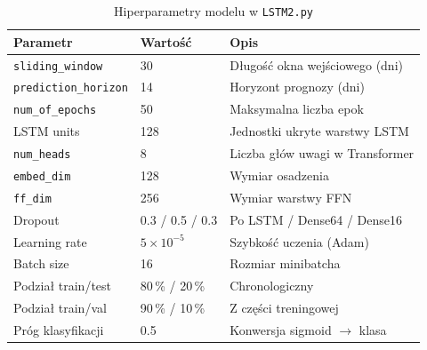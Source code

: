 \documentclass[12pt,a4paper]{report}
\begin{document}
\begin{table}[H]

\centering

\caption{Hiperparametry modelu w \texttt{LSTM2.py}}

\label{tab:parametry}

\begin{tabular}{@{}lll@{}}

\toprule

\textbf{Parametr} & \textbf{Wartość} & \textbf{Opis} \\

\midrule

\texttt{sliding\_window} & 30 & Długość okna wejściowego (dni) \\

\texttt{prediction\_horizon} & 14 & Horyzont prognozy (dni) \\

\texttt{num\_of\_epochs} & 50 & Maksymalna liczba epok \\

LSTM units & 128 & Jednostki ukryte warstwy LSTM \\

\texttt{num\_heads} & 8 & Liczba głów uwagi w Transformer \\

\texttt{embed\_dim} & 128 & Wymiar osadzenia \\

\texttt{ff\_dim} & 256 & Wymiar warstwy FFN \\

Dropout & 0.3 / 0.5 / 0.3 & Po LSTM / Dense64 / Dense16 \\

Learning rate & $5 \times 10^{-5}$ & Szybkość uczenia (Adam) \\

Batch size & 16 & Rozmiar minibatcha \\

Podział train/test & 80\,\% / 20\,\% & Chronologiczny \\

Podział train/val & 90\,\% / 10\,\% & Z części treningowej \\

Próg klasyfikacji & 0.5 & Konwersja sigmoid $\rightarrow$ klasa \\

\bottomrule

\end{tabular}

\end{table}
\end{document}
